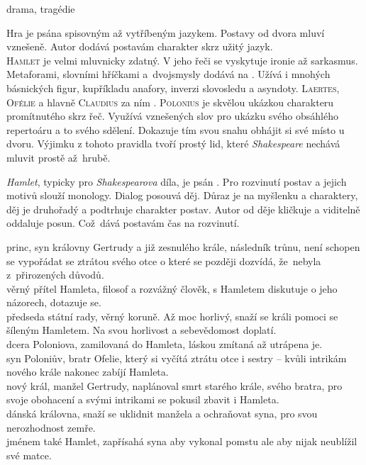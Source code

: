 \documentclass{extarticle} %
\begin{document}

\noindent drama, tragédie


\noindent Hra je psána spisovným až vytříbeným jazykem.
Postavy od dvora mluví vznešeně.
Autor dodává postavám charakter skrz užitý jazyk. \\
\textsc{Hamlet} je velmi mluvnicky zdatný.
V jeho řeči se vyskytuje ironie až sarkasmus.
Metaforami, slovními hříčkami a~dvojsmysly dodává na .
Užívá i mnohých básnických figur, kupříkladu anafory, inverzi slovosledu a asyndoty.
\textsc{Laertes}, \textsc{Ofélie} a hlavně \textsc{Claudius} za ním .
\textsc{Polonius} je skvělou ukázkou charakteru promítnutého skrz řeč.
Využívá  vznešených slov pro ukázku svého obsáhlého repertoáru a to  svého sdělení.
Dokazuje tím svou snahu obhájit si své místo u dvoru.
Výjimku z tohoto pravidla tvoří prostý lid, které \textit{Shakespeare} nechává mluvit prostě až~hrubě.  



\noindent\textit{Hamlet}, typicky pro \textit{Shakespearova} díla, je psán .
Pro rozvinutí postav a jejich motivů slouží monology.
Dialog posouvá děj.
Důraz je na myšlenku a charaktery, děj je druhořadý a podtrhuje charakter postav.
Autor od děje kličkuje a viditelně oddaluje posun.
Což~dává postavám čas na rozvinutí.

\noindent 
{} princ, syn královny Gertrudy a již zesnulého krále,
následník trůnu, není schopen se vypořádat se ztrátou svého otce o které se později dozvídá,
že~nebyla z~přirozených důvodů. \\
 věrný přítel Hamleta, filosof a rozvážný člověk,
s Hamletem diskutuje o jeho názorech, dotazuje se. \\
 předseda státní rady, věrný koruně. Až moc horlivý,
snaží se králi pomoci se šíleným Hamletem. Na svou horlivost a sebevědomost doplatí. \\
 dcera Poloniova, zamilovaná do Hamleta, láskou zmítaná až utrápena je. \\
 syn Poloniův, bratr Ofelie, který si vyčítá ztrátu otce i sestry
-- kvůli intrikám nového krále nakonec zabíjí Hamleta. \\
 nový král, manžel Gertrudy, naplánoval smrt starého krále,
svého bratra, pro svoje obohacení a svými intrikami se pokusil zbavit i Hamleta. \\
 dánská královna, snaží se uklidnit manžela a ochraňovat syna,
pro svou nerozhodnost zemře. \\
 jménem také Hamlet,
zapřísahá syna aby vykonal pomstu ale aby nijak neublížil své matce.
\end{document}
